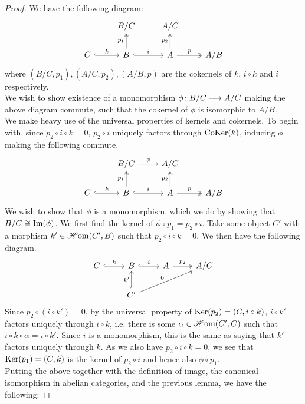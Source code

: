\documentclass[a4paper]{article}
\begin{document}
\begin{proof}
    We have the following diagram:
    \[
        \begin{tikzcd}
            & B/C & A/C & \\
            C \arrow[r, hook, "k"] & B \arrow[u, "p_1", two heads] \arrow[r, "i", hook] & A \arrow[u, "p_2", two heads] \arrow[r, "p", two heads] & A/B
        \end{tikzcd}
    \]
    where $(B/C, p_1), (A/C, p_2), (A/B, p)$ are the cokernels of $k$, $i\circ k$ and $i$ respectively.\\
    We wish to show existence of a monomorphism $\phi\colon B/C\longrightarrow A/C$ making the above diagram commute, such that the cokernel of $\phi$ is isomorphic to $A/B$.\\
    We make heavy use of the universal properties of kernels and cokernels. To begin with, since $p_2 \circ i \circ k = 0$, $p_2\circ i$ uniquely factors through $\operatorname{CoKer}(k)$, inducing $\phi$ making the following commute.
    \[
        \begin{tikzcd}
            & B/C \arrow[r, "\phi"] & A/C & \\
            C \arrow[r, hook, "k"] & B \arrow[u, "p_1", two heads] \arrow[r, "i", hook] & A \arrow[u, "p_2", two heads] \arrow[r, "p", two heads] & A/B
        \end{tikzcd}
    \]
    We wish to show that $\phi$ is a monomorphism, which we do by showing that $B/C \cong \operatorname{Im}(\phi)$. We first find the kernel of $\phi \circ p_1 = p_2 \circ i$. Take some object $C'$ with a morphism $k' \in \operatorname{\mathscr{H}om}(C', B)$ such that $p_2 \circ i \circ k = 0$. We then have the following diagram.
    \[
        \begin{tikzcd}
            C \arrow[r, "k", hook] & B \arrow[r, "i", hook] & A \arrow[r, "p_2", two heads] & A/C \\
            & C' \arrow[u, "k'", hook] \arrow[rru, "0"] & &
        \end{tikzcd}
    \]
    Since $p_2 \circ (i \circ k') = 0$, by the universal property of $\operatorname{Ker}(p_2) = (C, i\circ k)$, $i\circ k'$ factors uniquely through $i \circ k$, i.e. there is some $\alpha \in \operatorname{\mathscr{H}om}(C', C)$ such that $i \circ k \circ \alpha = i \circ k'$. Since $i$ is a monomorphism, this is the same as saying that $k'$ factors uniquely through $k$. As we also have $p_2 \circ i \circ k = 0$, we see that $\operatorname{Ker}(p_1)=(C,k)$ is the kernel of $p_2 \circ i$ and hence also $\phi \circ p_1$.\\
    Putting the above together with the definition of image, the canonical isomorphism in abelian categories, and the previous lemma, we have the following:

\end{proof}
\end{document}
